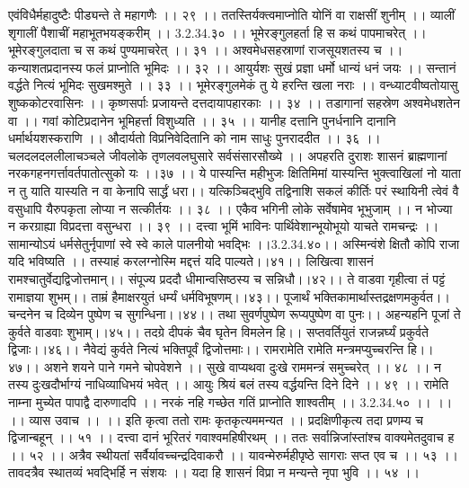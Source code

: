 एवंविधैर्महादुष्टैः पीड्यन्ते ते महागणैः ।। २९ ।।
ततस्तिर्यक्त्वमाप्नोति योनिं वा राक्षसीं शुनीम् ।।
व्यालीं शृगालीं पैशाचीं महाभूतभयङ्करीम् ।। 3.2.34.३० ।।
भूमेरङ्गुलहर्ता हि स कथं पापमाचरेत् ।।
भूमेरङ्गुलदाता च स कथं पुण्यमाचरेत् ।। ३१ ।।
अश्वमेधसहस्राणां राजसूयशतस्य च ।।
कन्याशतप्रदानस्य फलं प्राप्नोति भूमिदः ।। ३२ ।।
आयुर्यशः सुखं प्रज्ञा धर्मो धान्यं धनं जयः ।।
सन्तानं वर्द्धते नित्यं भूमिदः सुखमश्मुते ।। ३३ ।।
भूमेरङ्गुलमेकं तु ये हरन्ति खला नराः ।।
वन्ध्याटवीष्वतोयासु शुष्ककोटरवासिनः ।।
कृष्णसर्पाः प्रजायन्ते दत्तदायापहारकाः ।। ३४ ।।
तडागानां सहस्रेण अश्वमेधशतेन वा ।।
गवां कोटिप्रदानेन भूमिहर्त्ता विशुध्यति ।। ३५ ।।
यानीह दत्तानि पुनर्धनानि दानानि धर्मार्थयशस्कराणि ।।
औदार्यतो विप्रनिवेदितानि को नाम साधुः पुनराददीत ।। ३६ ।।
चलदलदललीलाचञ्चले जीवलोके तृणलवलघुसारे सर्वसंसारसौख्ये ।।
अपहरति दुराशः शासनं ब्राह्मणानां नरकगहनगर्त्तावर्तपातोत्सुको यः ।।३७ ।।
ये पास्यन्ति महीभुजः क्षितिमिमां यास्यन्ति भुक्त्वाखिलां नो याता न तु याति यास्यति न वा केनापि सार्द्धं धरा।।
यत्किञ्चिद्भुवि तद्विनाशि सकलं कीर्तिः परं स्थायिनी त्वेवं वै वसुधापि यैरुपकृता लोप्या न सत्कीर्तयः ।। ३८ ।।
एकैव भगिनी लोके सर्वेषामेव भूभुजाम् ।।
न भोज्या न करग्राह्या विप्रदत्ता वसुन्धरा ।। ३९ ।।
दत्त्वा भूमिं भाविनः पार्थिवेशान्भूयोभूयो याचते रामचन्द्रः ।।
सामान्योऽयं धर्मसेतुर्नृपाणां स्वे स्वे काले पालनीयो भवद्भिः ।।3.2.34.४०।।
अस्मिन्वंशे क्षितौ कोपि राजा यदि भविष्यति ।।
तस्याहं करलग्नोस्मि मद्दत्तं यदि पाल्यते।।४१।।
लिखित्वा शासनं रामश्चातुर्वेद्यद्विजोत्तमान्।।
संपूज्य प्रददौ धीमान्वसिष्ठस्य च सन्निधौ।।४२।।
ते वाडवा गृहीत्वा तं पट्टं रामाज्ञया शुभम्।।
ताम्रं हैमाक्षरयुतं धर्म्यं धर्मविभूषणम्।।४३।।
पूजार्थं भक्तिकामार्थास्तद्रक्षणमकुर्वत।।
चन्दनेन च दिव्येन पुष्पेण च सुगन्धिना।।४४।।
तथा सुवर्णपुष्पेण रूप्यपुष्पेण वा पुनः।।
अहन्यहनि पूजां ते कुर्वते वाडवाः शुभाम्।।४५।।
तदग्रे दीपकं चैव घृतेन विमलेन हि।।
सप्तवर्तियुतं राजन्नर्घ्यं प्रकुर्वते द्विजाः।।४६।।
नैवेद्यं कुर्वते नित्यं भक्तिपूर्वं द्विजोत्तमाः।।
रामरामेति रामेति मन्त्रमप्युच्चरन्ति हि।।४७।।
अशने शयने पाने गमने चोपवेशने ।।
सुखे वाप्यथवा दुःखे राममन्त्रं समुच्चरेत् ।। ४८ ।।
न तस्य दुःखदौर्भाग्यं नाधिव्याधिभयं भवेत् ।।
आयुः श्रियं बलं तस्य वर्द्धयन्ति दिने दिने ।। ४९ ।।
रामेति नाम्ना मुच्येत पापाद्वै दारुणादपि ।।
नरकं नहि गच्छेत गतिं प्राप्नोति शाश्वतीम् ।। 3.2.34.५० ।। ।।
।। व्यास उवाच ।। ।।
इति कृत्वा ततो रामः कृतकृत्यममन्यत ।।
प्रदक्षिणीकृत्य तदा प्रणम्य च द्विजान्बहून् ।। ५१ ।।
दत्त्वा दानं भूरितरं गवाश्वमहिषीरथम् ।।
ततः सर्वान्निजांस्तांश्च वाक्यमेतदुवाच ह ।। ५२ ।।
अत्रैव स्थीयतां सर्वैर्यावच्चन्द्रदिवाकरौ ।।
यावन्मेरुर्महीपृष्ठे सागराः सप्त एव च ।। ५३ ।।
तावदत्रैव स्थातव्यं भवद्भिर्हि न संशयः ।।
यदा हि शासनं विप्रा न मन्यन्ते नृपा भुवि ।। ५४ ।।
